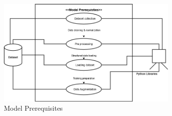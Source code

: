 \documentclass[12pt,a4paper]{report}
\begin{document}
\begin{figure}[H]
\centering
\includegraphics[width=0.8\textwidth]{figures/model_prerequisites_diagram.png}
\caption{Model Prerequisites}
\label{fig:model_prerequisites}
\end{figure}
\end{document}
